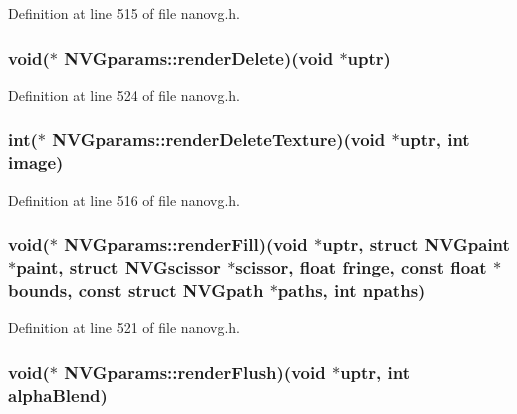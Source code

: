 Definition at line 515 of file nanovg.\+h.

\hypertarget{struct_n_v_gparams_a92fc1339d100af7cc4b5fdeb7b36e63c}{
\subsubsection[{render\+Delete}]{\setlength{\rightskip}{0pt plus 5cm}void($\ast$ N\+V\+Gparams\+::render\+Delete)(void $\ast$uptr)}}\label{struct_n_v_gparams_a92fc1339d100af7cc4b5fdeb7b36e63c}


Definition at line 524 of file nanovg.\+h.

\hypertarget{struct_n_v_gparams_a165c064c1c1a454a45e2848feedd5fdd}{
\subsubsection[{render\+Delete\+Texture}]{\setlength{\rightskip}{0pt plus 5cm}int($\ast$ N\+V\+Gparams\+::render\+Delete\+Texture)(void $\ast$uptr, int image)}}\label{struct_n_v_gparams_a165c064c1c1a454a45e2848feedd5fdd}


Definition at line 516 of file nanovg.\+h.

\hypertarget{struct_n_v_gparams_ac484f24518e2653dea0739b7f35a8614}{
\subsubsection[{render\+Fill}]{\setlength{\rightskip}{0pt plus 5cm}void($\ast$ N\+V\+Gparams\+::render\+Fill)(void $\ast$uptr, struct {\bf N\+V\+Gpaint} $\ast$paint, struct {\bf N\+V\+Gscissor} $\ast$scissor, float fringe, const float $\ast$bounds, const struct {\bf N\+V\+Gpath} $\ast$paths, int npaths)}}\label{struct_n_v_gparams_ac484f24518e2653dea0739b7f35a8614}


Definition at line 521 of file nanovg.\+h.

\hypertarget{struct_n_v_gparams_a5c2b79e8bf66c15b1f265c39cb4f277c}{
\subsubsection[{render\+Flush}]{\setlength{\rightskip}{0pt plus 5cm}void($\ast$ N\+V\+Gparams\+::render\+Flush)(void $\ast$uptr, int alpha\+Blend)}}\label{struct_n_v_gparams_a5c2b79e8bf66c15b1f265c39cb4f277c}


